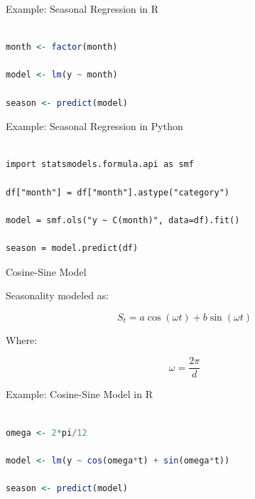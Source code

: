 \documentclass[aspectratio=169]{beamer}
\begin{document}
\begin{frame}[fragile]{Example: Seasonal Regression in R}

\begin{lstlisting}[language=R]

month <- factor(month)

model <- lm(y ~ month)

season <- predict(model)

\end{lstlisting}

\end{frame}

\begin{frame}[fragile]{Example: Seasonal Regression in Python}

\begin{lstlisting}

import statsmodels.formula.api as smf

df["month"] = df["month"].astype("category")

model = smf.ols("y ~ C(month)", data=df).fit()

season = model.predict(df)

\end{lstlisting}

\end{frame}

\begin{frame}{Cosine-Sine Model}

Seasonality modeled as:

\[
S_t =
a \cos(\omega t)
+
b \sin(\omega t)
\]

Where:

\[
\omega =
\frac{2\pi}{d}
\]

\end{frame}

\begin{frame}[fragile]{Example: Cosine-Sine Model in R}

\begin{lstlisting}[language=R]

omega <- 2*pi/12

model <- lm(y ~ cos(omega*t) + sin(omega*t))

season <- predict(model)

\end{lstlisting}

\end{frame}
\end{document}
